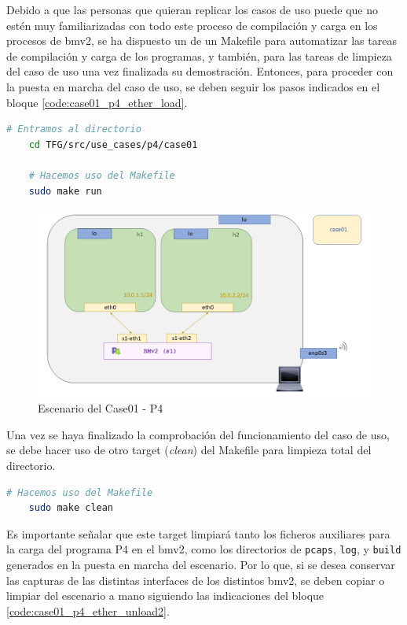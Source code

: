 \vspace{0.5cm}

Debido a que las personas que quieran replicar los casos de uso puede que no estén muy familiarizadas con todo este proceso de compilación y carga en los procesos de \gls{bmv2}, se ha dispuesto un de un Makefile para automatizar las tareas de compilación y carga de los programas, y también, para las tareas de limpieza del caso de uso una vez finalizada su demostración. Entonces, para proceder con la puesta en marcha del caso de uso, se deben seguir los pasos indicados en el bloque \ref{code:case01_p4_ether_load}.

\newpage

\begin{lstlisting}[language= bash, style=Consola, caption={Compilación programa P4 y puesta en marcha del escenario  - Case01},label=code:case01_p4_ether_load]
    # Entramos al directorio 
    cd TFG/src/use_cases/p4/case01

    # Hacemos uso del Makefile
    sudo make run
\end{lstlisting}
\vspace{0.5cm}

\begin{figure}[ht]
    \centering
    \includegraphics[width=16cm]{archivos/img/dev/p4/case01/scenario.png}
    \caption{Escenario del Case01 - P4}
    \label{fig:case01_p4_ether_scenario}
\end{figure}

Una vez se haya finalizado la comprobación del funcionamiento del caso de uso, se debe hacer uso de otro target (\textit{clean}) del Makefile para limpieza total del directorio.

\begin{lstlisting}[language= bash, style=Consola, caption={Limpieza del escenario P4 - Case01},label=code:case01_p4_ether_unload]
    # Hacemos uso del Makefile
    sudo make clean
\end{lstlisting}
\vspace{0.5cm}
Es importante señalar que este target limpiará tanto los ficheros auxiliares para la carga del programa P4 en el \gls{bmv2}, como los directorios de \texttt{pcaps}, \texttt{log}, y \texttt{build} generados en la puesta en marcha del escenario. Por lo que, si se desea conservar las capturas de las distintas interfaces de los distintos \gls{bmv2}, se deben copiar o limpiar del escenario a mano siguiendo las indicaciones del bloque \ref{code:case01_p4_ether_unload2}.

